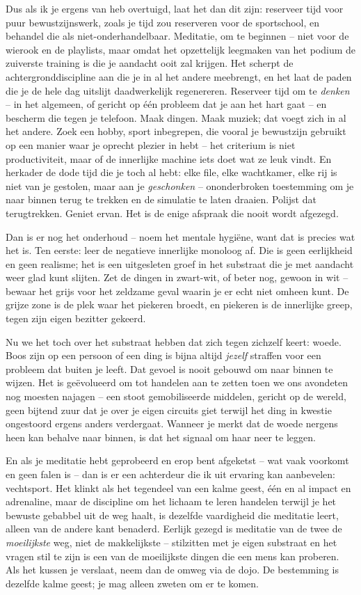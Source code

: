 \documentclass[11pt, twoside, openright]{book}
\begin{document}
Dus als ik je ergens van heb overtuigd, laat het dan dit zijn: reserveer tijd voor puur bewustzijnswerk, zoals je tijd zou reserveren voor de sportschool, en behandel die als niet-onderhandelbaar. Meditatie, om te beginnen -- niet voor de wierook en de playlists, maar omdat het opzettelijk leegmaken van het podium de zuiverste training is die je aandacht ooit zal krijgen. Het scherpt de achtergronddiscipline aan die je in al het andere meebrengt, en het laat de paden die je de hele dag uitslijt daadwerkelijk regenereren. Reserveer tijd om te \textit{denken} -- in het algemeen, of gericht op één probleem dat je aan het hart gaat -- en bescherm die tegen je telefoon. Maak dingen. Maak muziek; dat voegt zich in al het andere. Zoek een hobby, sport inbegrepen, die vooral je bewustzijn gebruikt op een manier waar je oprecht plezier in hebt -- het criterium is niet productiviteit, maar of de innerlijke machine iets doet wat ze leuk vindt. En herkader de dode tijd die je toch al hebt: elke file, elke wachtkamer, elke rij is niet van je gestolen, maar aan je \textit{geschonken} -- ononderbroken toestemming om je naar binnen terug te trekken en de simulatie te laten draaien. Polijst dat terugtrekken. Geniet ervan. Het is de enige afspraak die nooit wordt afgezegd.

Dan is er nog het onderhoud -- noem het mentale hygiëne, want dat is precies wat het is. Ten eerste: leer de negatieve innerlijke monoloog af. Die is geen eerlijkheid en geen realisme; het is een uitgesleten groef in het substraat die je met aandacht weer glad kunt slijten. Zet de dingen in zwart-wit, of beter nog, gewoon in wit -- bewaar het grijs voor het zeldzame geval waarin je er echt niet omheen kunt. De grijze zone is de plek waar het piekeren broedt, en piekeren is de innerlijke greep, tegen zijn eigen bezitter gekeerd.

Nu we het toch over het substraat hebben dat zich tegen zichzelf keert: woede. Boos zijn op een persoon of een ding is bijna altijd \textit{jezelf} straffen voor een probleem dat buiten je leeft. Dat gevoel is nooit gebouwd om naar binnen te wijzen. Het is geëvolueerd om tot handelen aan te zetten toen we ons avondeten nog moesten najagen -- een stoot gemobiliseerde middelen, gericht op de wereld, geen bijtend zuur dat je over je eigen circuits giet terwijl het ding in kwestie ongestoord ergens anders verdergaat. Wanneer je merkt dat de woede nergens heen kan behalve naar binnen, is dat het signaal om haar neer te leggen.

En als je meditatie hebt geprobeerd en erop bent afgeketst -- wat vaak voorkomt en geen falen is -- dan is er een achterdeur die ik uit ervaring kan aanbevelen: vechtsport. Het klinkt als het tegendeel van een kalme geest, één en al impact en adrenaline, maar de discipline om het lichaam te leren handelen terwijl je het bewuste gebabbel uit de weg haalt, is dezelfde vaardigheid die meditatie leert, alleen van de andere kant benaderd. Eerlijk gezegd is meditatie van de twee de \textit{moeilijkste} weg, niet de makkelijkste -- stilzitten met je eigen substraat en het vragen stil te zijn is een van de moeilijkste dingen die een mens kan proberen. Als het kussen je verslaat, neem dan de omweg via de dojo. De bestemming is dezelfde kalme geest; je mag alleen zweten om er te komen.
\end{document}
